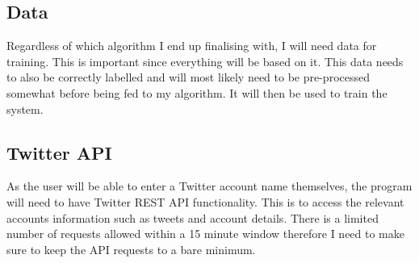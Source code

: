 \subsection{Data}
Regardless of which algorithm I end up finalising with, I will need data for training. This is important since everything will be based on it. This data needs to also be correctly labelled and will most likely need to be pre-processed somewhat before being fed to my algorithm. It will then be used to train the system.

\subsection{Twitter API}
As the user will be able to enter a Twitter account name themselves, the program will need to have Twitter REST API functionality. This is to access the relevant accounts information such as tweets and account details. There is a limited number of requests allowed within a 15 minute window therefore I need to make sure to keep the API requests to a bare minimum. 

